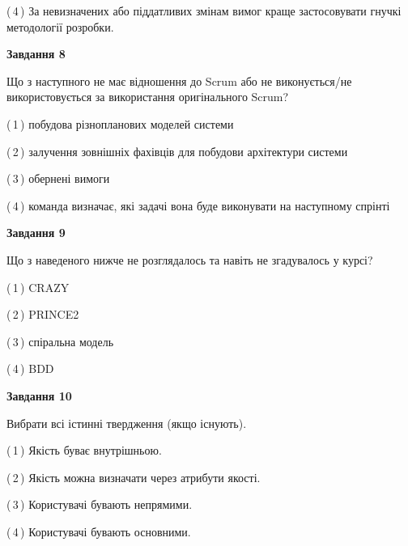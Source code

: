 \documentclass[10pt, ukrainian]{article}
\begin{document}
{\begin {large}
(\,4\,) За невизначених або піддатливих змінам вимог краще застосовувати гнучкі методології розробки. %


{\begin {center}\textbf{Завдання 8}\end {center}}\par
Що з наступного не має відношення до Scrum або не виконується/не використовується за використання оригінального Scrum?\par
\vspace{2mm}



(\,1\,) побудова різнопланових моделей системи%



(\,2\,) залучення зовнішніх фахівців для побудови архітектури системи%



(\,3\,) обернені вимоги%



(\,4\,) команда визначає, які задачі вона буде виконувати на наступному спрінті%


{\begin {center}\textbf{Завдання 9}\end {center}}\par
Що з наведеного нижче не розглядалось та навіть не згадувалось у курсі?\par
\vspace{2mm}



(\,1\,) CRAZY%



(\,2\,) PRINCE2%



(\,3\,) спіральна модель%



(\,4\,) BDD%


{\begin {center}\textbf{Завдання 10}\end {center}}\par
Вибрати всі істинні твердження (якщо існують).\par
\vspace{2mm}



(\,1\,) Якість буває внутрішньою.%



(\,2\,) Якість можна визначати через атрибути якості.%



(\,3\,) Користувачі бувають непрямими.%



(\,4\,) Користувачі бувають основними.%



\end {large}}
\end{document}
